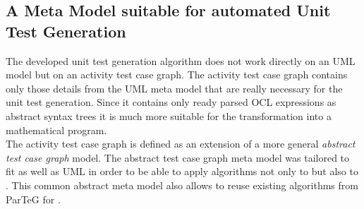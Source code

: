 \subsection{A Meta Model suitable for automated Unit Test Generation}
\label{sec:TestCaseGraph}
The developed unit test generation algorithm does not work directly on an UML model but on an activity test case graph. The activity test case graph contains only those details from the UML meta model that are really necessary for the unit test generation. Since it contains only ready parsed OCL expressions as abstract syntax trees it is much more suitable for the transformation into a mathematical program.\\
The activity test case graph is defined as an extension of a more general \emph{abstract test case graph} model. The abstract test case graph meta model was tailored to fit  as well as UML  in order to be able to apply algorithms not only to  but also to . This common abstract meta model also allows to reuse existing algorithms from ParTeG \cite{ParTeG} for .



